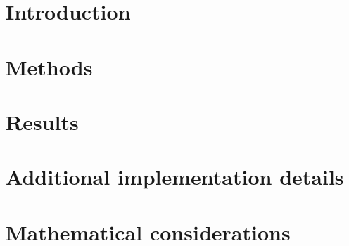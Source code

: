 \documentclass[a4paper,11pt,twoside,openany,british]{book}
\begin{document}
\frontmatter

\tableofcontents

\mainmatter
\chapter{Introduction}
\label{sec:Introduction}

\chapter{Methods}
\label{sec:Methods}


\chapter{Results}
\label{sec:Results}


\appendix
\chapter{Additional implementation details}

\chapter{Mathematical considerations}


\backmatter
\printbibliography[heading=bibintoc]
\printnoidxglossary[type=definitions]
\printnoidxglossary[type=\acronymtype,nonumberlist]
\printnoidxglossary[type=symbols,nonumberlist]
\glsaddallunused[symbols]
\end{document}
